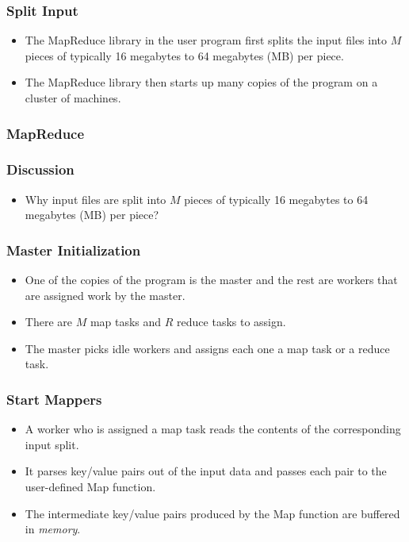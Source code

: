 \documentclass{beamer}
\begin{document}
\begin{frame}
  \frametitle{Split Input}
  \begin{itemize}
    \item The MapReduce library in the user program first splits the
      input files into $M$ pieces of typically 16 megabytes to 64
      megabytes (MB) per piece.
    \item The MapReduce library then starts up many copies of the
      program on a cluster of machines.
  \end{itemize}
\end{frame}

\begin{frame}
\frametitle{MapReduce}
\centerline{}
\end{frame}

\begin{frame}
  \frametitle{Discussion}
  \begin{itemize}
    \item Why input files are split into $M$ pieces of typically 16
      megabytes to 64 megabytes (MB) per piece?
  \end{itemize}
\end{frame}

\begin{frame}
  \frametitle{Master Initialization}
  \begin{itemize}
    \item One of the copies of the program is the master and the rest
      are workers that are assigned work by the master. 
    \item There are $M$ map tasks and $R$ reduce tasks to assign.
    \item The master picks idle workers and assigns each one a map
      task or a reduce task.
  \end{itemize}
\end{frame}
    
\begin{frame}
  \frametitle{Start Mappers}
  \begin{itemize}
    \item A worker who is assigned a map task reads the contents of
      the corresponding input split. 
    \item It parses key/value pairs out of the input data and passes
      each pair to the user-defined Map function. 
    \item The intermediate key/value pairs produced by the Map
      function are buffered in {\em memory}.
  \end{itemize}
\end{frame}
\end{document}

